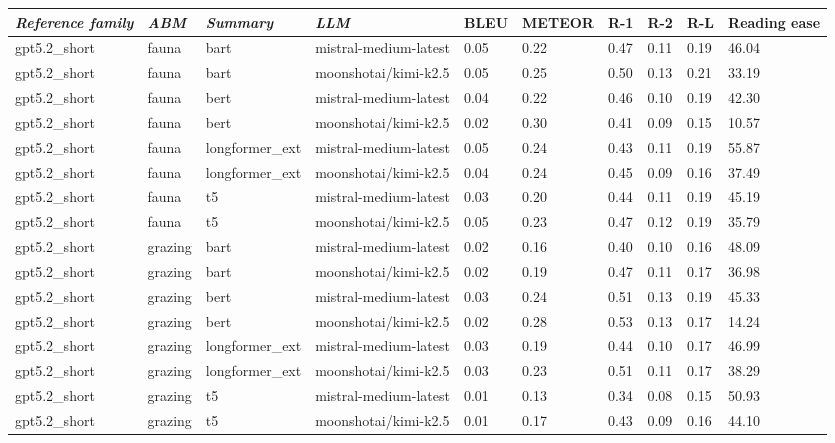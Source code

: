 \begin{tabular}{|l|l|l|l|l|l|l|l|l|l|}
\hline
\textit{\textbf{Reference family}} & \textit{\textbf{ABM}} & \textit{\textbf{Summary}} & \textit{\textbf{LLM}} & BLEU & METEOR & R-1 & R-2 & R-L & Reading ease \\
 \hline
 gpt5.2\_short & fauna & bart & mistral-medium-latest & 0.05 & 0.22 & 0.47 & 0.11 & 0.19 & 46.04 \\
 \hline
 gpt5.2\_short & fauna & bart & moonshotai/kimi-k2.5 & 0.05 & 0.25 & 0.50 & 0.13 & 0.21 & 33.19 \\
 \hline
 gpt5.2\_short & fauna & bert & mistral-medium-latest & 0.04 & 0.22 & 0.46 & 0.10 & 0.19 & 42.30 \\
 \hline
 gpt5.2\_short & fauna & bert & moonshotai/kimi-k2.5 & 0.02 & 0.30 & 0.41 & 0.09 & 0.15 & 10.57 \\
 \hline
 gpt5.2\_short & fauna & longformer\_ext & mistral-medium-latest & 0.05 & 0.24 & 0.43 & 0.11 & 0.19 & 55.87 \\
 \hline
 gpt5.2\_short & fauna & longformer\_ext & moonshotai/kimi-k2.5 & 0.04 & 0.24 & 0.45 & 0.09 & 0.16 & 37.49 \\
 \hline
 gpt5.2\_short & fauna & t5 & mistral-medium-latest & 0.03 & 0.20 & 0.44 & 0.11 & 0.19 & 45.19 \\
 \hline
 gpt5.2\_short & fauna & t5 & moonshotai/kimi-k2.5 & 0.05 & 0.23 & 0.47 & 0.12 & 0.19 & 35.79 \\
 \hline
 gpt5.2\_short & grazing & bart & mistral-medium-latest & 0.02 & 0.16 & 0.40 & 0.10 & 0.16 & 48.09 \\
 \hline
 gpt5.2\_short & grazing & bart & moonshotai/kimi-k2.5 & 0.02 & 0.19 & 0.47 & 0.11 & 0.17 & 36.98 \\
 \hline
 gpt5.2\_short & grazing & bert & mistral-medium-latest & 0.03 & 0.24 & 0.51 & 0.13 & 0.19 & 45.33 \\
 \hline
 gpt5.2\_short & grazing & bert & moonshotai/kimi-k2.5 & 0.02 & 0.28 & 0.53 & 0.13 & 0.17 & 14.24 \\
 \hline
 gpt5.2\_short & grazing & longformer\_ext & mistral-medium-latest & 0.03 & 0.19 & 0.44 & 0.10 & 0.17 & 46.99 \\
 \hline
 gpt5.2\_short & grazing & longformer\_ext & moonshotai/kimi-k2.5 & 0.03 & 0.23 & 0.51 & 0.11 & 0.17 & 38.29 \\
 \hline
 gpt5.2\_short & grazing & t5 & mistral-medium-latest & 0.01 & 0.13 & 0.34 & 0.08 & 0.15 & 50.93 \\
 \hline
 gpt5.2\_short & grazing & t5 & moonshotai/kimi-k2.5 & 0.01 & 0.17 & 0.43 & 0.09 & 0.16 & 44.10 \\

\end{tabular}

